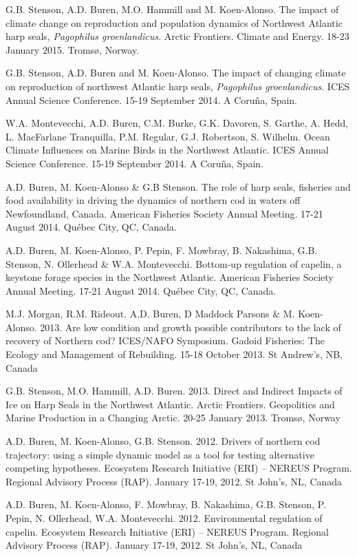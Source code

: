 \documentclass{res}
\begin{document}
\begin{resume}
\begin{hangparas}{.4in}{1}
G.B. Stenson, A.D. Buren, M.O. Hammill and M. Koen-Alonso. The impact of climate change on reproduction and population dynamics of Northwest Atlantic harp seals, \textit{Pagophilus groenlandicus}. Arctic Frontiers. Climate and Energy. 18-23 January 2015. Troms{\o}, Norway.

G.B. Stenson, A.D. Buren and M. Koen-Alonso. The impact of changing climate on reproduction of northwest Atlantic harp seals, \textit{Pagophilus groenlandicus}. ICES Annual Science Conference. 15-19 September 2014. A Coru\~{n}a, Spain.

W.A. Montevecchi, A.D. Buren, C.M. Burke, G.K. Davoren, S. Garthe, A. Hedd, L. MacFarlane Tranquilla, P.M. Regular, G.J. Robertson, S. Wilhelm. Ocean Climate Influences on Marine Birds in the Northwest Atlantic. ICES Annual Science Conference. 15-19 September 2014. A Coru\~{n}a, Spain.

A.D. Buren, M. Koen-Alonso \& G.B Stenson. The role of harp seals, fisheries and food availability in driving the dynamics of northern cod in waters off Newfoundland, Canada. American Fisheries Society Annual Meeting. 17-21 August 2014. Qu\'{e}bec City, QC, Canada.

A.D. Buren, M. Koen-Alonso, P. Pepin, F. Mowbray, B. Nakashima, G.B. Stenson, N. Ollerhead \& W.A. Montevecchi. Bottom-up regulation of capelin, a keystone forage species in the Northwest Atlantic. American Fisheries Society Annual Meeting. 17-21 August 2014. Qu\'{e}bec City, QC, Canada.

\pagebreak

M.J. Morgan, R.M. Rideout. A.D. Buren, D Maddock Parsons \& M. Koen-Alonso. 2013. Are low condition and growth possible contributors to the lack of recovery of Northern cod? ICES/NAFO Symposium. Gadoid Fisheries: The Ecology and Management of Rebuilding. 15-18 October 2013. St Andrew's, NB, Canada


G.B. Stenson, M.O. Hammill, A.D. Buren. 2013. Direct and Indirect Impacts of Ice on Harp Seals in the Northwest Atlantic. Arctic Frontiers. Geopolitics and Marine Production in a Changing Arctic. 20-25 January 2013. Troms{\o}, Norway

A.D. Buren, M. Koen-Alonso, G.B. Stenson. 2012. Drivers of northern cod trajectory: using a simple dynamic model as a tool for testing alternative competing hypotheses. Ecosystem Research Initiative (ERI) – NEREUS Program. Regional Advisory Process (RAP). January 17-19, 2012. St John's, NL, Canada

A.D. Buren, M. Koen-Alonso, F. Mowbray, B. Nakashima, G.B. Stenson, P. Pepin, N. Ollerhead, W.A. Montevecchi. 2012. Environmental regulation of capelin. Ecosystem Research Initiative (ERI) – NEREUS Program. Regional Advisory Process (RAP). January 17-19, 2012. St John's, NL, Canada


\end{hangparas}
\end{resume}
\end{document}
